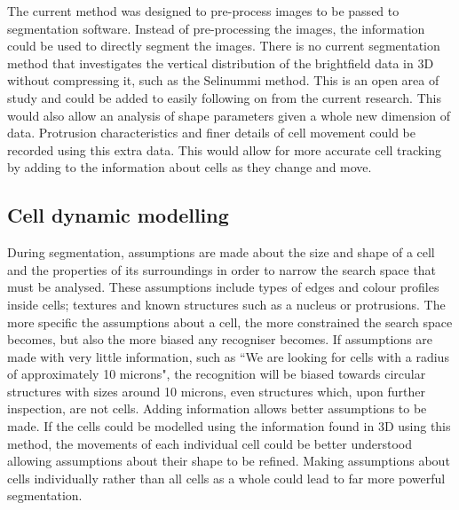 The current method was designed to pre-process images to be passed to segmentation software. Instead of pre-processing the images, the information could be used to directly segment the images. There is no current segmentation method that investigates the vertical distribution of the brightfield data in 3D without compressing it, such as the Selinummi method. This is an open area of study and could be added to easily following on from the current research. This would also allow an analysis of shape parameters given a whole new dimension of data. Protrusion characteristics and finer details of cell movement could be recorded using this extra data. This would allow for more accurate cell tracking by adding to the information about cells as they change and move.

\subsection{Cell dynamic modelling}

During segmentation, assumptions are made about the size and shape of a cell and the properties of its surroundings in order to narrow the search space that must be analysed. These assumptions include types of edges and colour profiles inside cells; textures and known structures such as a nucleus or protrusions. The more specific the assumptions about a cell, the more constrained the search space becomes, but also the more biased any recogniser becomes. If assumptions are made with very little information, such as ``We are looking for cells with a radius of approximately 10 microns", the recognition will be biased towards circular structures with sizes around 10 microns, even structures which, upon further inspection, are not cells. Adding information allows better assumptions to be made. If the cells could be modelled using the information found in 3D using this method, the movements of each individual cell could be better understood allowing assumptions about their shape to be refined. Making assumptions about cells individually rather than all cells as a whole could lead to far more powerful segmentation.

